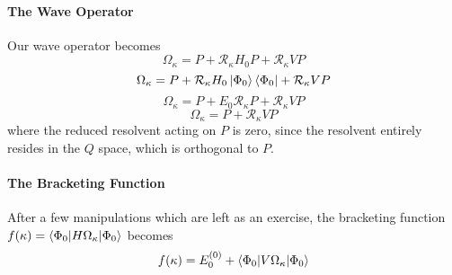 \documentclass{article}
\newcommand{\Ezero}{E^{(0)}}
\begin{document}
\paragraph{\textbf{The Wave Operator}}
Our wave operator becomes
\[\Omega_\kappa = P + \mathcal{R}_{\kappa} H_0 P + \mathcal{R}_{\kappa} V P \]
\[\Omega_\kappa = P + \mathcal{R}_{\kappa} H_0 \ket{\Phi_0}\bra{\Phi_0} + \mathcal{R}_{\kappa} V P \]
\[\Omega_\kappa = P + E_0 \mathcal{R}_{\kappa} P + \mathcal{R}_{\kappa} V P \]
\[\Omega_\kappa = P + \mathcal{R}_{\kappa} V P \]
where the reduced resolvent acting on $P$ is zero, since the resolvent entirely resides in the $Q$ space, which is orthogonal to $P$.

\paragraph{\textbf{The Bracketing Function}}
After a few manipulations which are left as an exercise, 
the bracketing function $f(\kappa) = \braket{\Phi_0 | H \Omega_\kappa | \Phi_0}$ becomes 
\[f(\kappa) = \Ezero_0 + \braket{\Phi_0 | V \Omega_\kappa | \Phi_0 } \]
\end{document}
